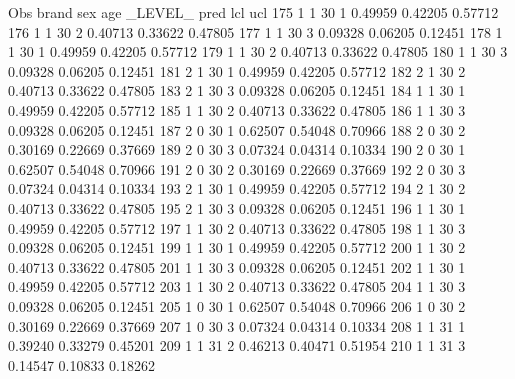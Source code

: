 \documentclass{article}
\begin{document}
\begin{Woutput}
 Obs    brand    sex    age    _LEVEL_      pred       lcl        ucl
 175      1       1      30       1       0.49959    0.42205    0.57712
 176      1       1      30       2       0.40713    0.33622    0.47805
 177      1       1      30       3       0.09328    0.06205    0.12451
 178      1       1      30       1       0.49959    0.42205    0.57712
 179      1       1      30       2       0.40713    0.33622    0.47805
 180      1       1      30       3       0.09328    0.06205    0.12451
 181      2       1      30       1       0.49959    0.42205    0.57712
 182      2       1      30       2       0.40713    0.33622    0.47805
 183      2       1      30       3       0.09328    0.06205    0.12451
 184      1       1      30       1       0.49959    0.42205    0.57712
 185      1       1      30       2       0.40713    0.33622    0.47805
 186      1       1      30       3       0.09328    0.06205    0.12451
 187      2       0      30       1       0.62507    0.54048    0.70966
 188      2       0      30       2       0.30169    0.22669    0.37669
 189      2       0      30       3       0.07324    0.04314    0.10334
 190      2       0      30       1       0.62507    0.54048    0.70966
 191      2       0      30       2       0.30169    0.22669    0.37669
 192      2       0      30       3       0.07324    0.04314    0.10334
 193      2       1      30       1       0.49959    0.42205    0.57712
 194      2       1      30       2       0.40713    0.33622    0.47805
 195      2       1      30       3       0.09328    0.06205    0.12451
 196      1       1      30       1       0.49959    0.42205    0.57712
 197      1       1      30       2       0.40713    0.33622    0.47805
 198      1       1      30       3       0.09328    0.06205    0.12451
 199      1       1      30       1       0.49959    0.42205    0.57712
 200      1       1      30       2       0.40713    0.33622    0.47805
 201      1       1      30       3       0.09328    0.06205    0.12451
 202      1       1      30       1       0.49959    0.42205    0.57712
 203      1       1      30       2       0.40713    0.33622    0.47805
 204      1       1      30       3       0.09328    0.06205    0.12451
 205      1       0      30       1       0.62507    0.54048    0.70966
 206      1       0      30       2       0.30169    0.22669    0.37669
 207      1       0      30       3       0.07324    0.04314    0.10334
 208      1       1      31       1       0.39240    0.33279    0.45201
 209      1       1      31       2       0.46213    0.40471    0.51954
 210      1       1      31       3       0.14547    0.10833    0.18262

\end{Woutput}
\end{document}
